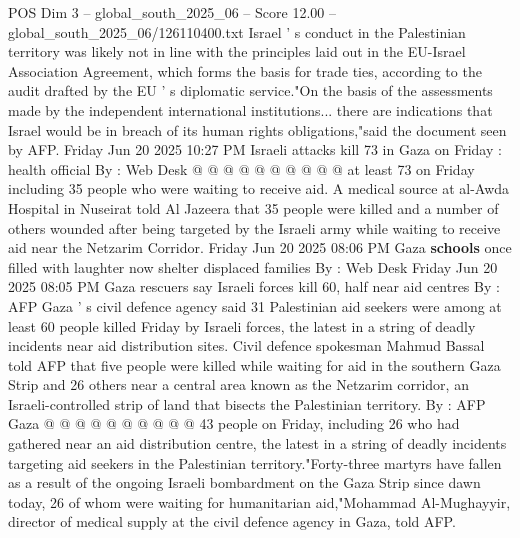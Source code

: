 \begin{textsample}{POS Dim 3 – global\_south\_2025\_06 – Score 12.00 – global\_south\_2025\_06/126110400.txt}
Israel ' s conduct in the Palestinian territory was likely not in line with the principles laid out in the EU-Israel Association Agreement, which forms the basis for trade ties, according to the audit drafted by the EU ' s diplomatic service."On the basis of the assessments made by the independent international institutions... there are indications that Israel would be in breach of its human rights obligations,"said the document seen by AFP.
Friday Jun 20 2025 10:27 PM Israeli attacks kill 73 in Gaza on Friday : health official By : Web Desk @ @ @ @ @ @ @ @ @ @ at least 73 on Friday including 35 people who were waiting to receive aid.
A medical source at al-Awda Hospital in Nuseirat told Al Jazeera that 35 people were killed and a number of others wounded after being targeted by the Israeli army while waiting to receive aid near the Netzarim Corridor.
Friday Jun 20 2025 08:06 PM Gaza \textbf{schools} once filled with laughter now shelter displaced families By : Web Desk Friday Jun 20 2025 08:05 PM Gaza rescuers say Israeli forces kill 60, half near aid centres By : AFP Gaza ' s civil defence agency said 31 Palestinian aid seekers were among at least 60 people killed Friday by Israeli forces, the latest in a string of deadly incidents near aid distribution sites.
Civil defence spokesman Mahmud Bassal told AFP that five people were killed while waiting for aid in the southern Gaza Strip and 26 others near a central area known as the Netzarim corridor, an Israeli-controlled strip of land that bisects the Palestinian territory.
By : AFP Gaza @ @ @ @ @ @ @ @ @ @ 43 people on Friday, including 26 who had gathered near an aid distribution centre, the latest in a string of deadly incidents targeting aid seekers in the Palestinian territory."Forty-three martyrs have fallen as a result of the ongoing Israeli bombardment on the Gaza Strip since dawn today, 26 of whom were waiting for humanitarian aid,"Mohammad Al-Mughayyir, director of medical supply at the civil defence agency in Gaza, told AFP.

\end{textsample}
